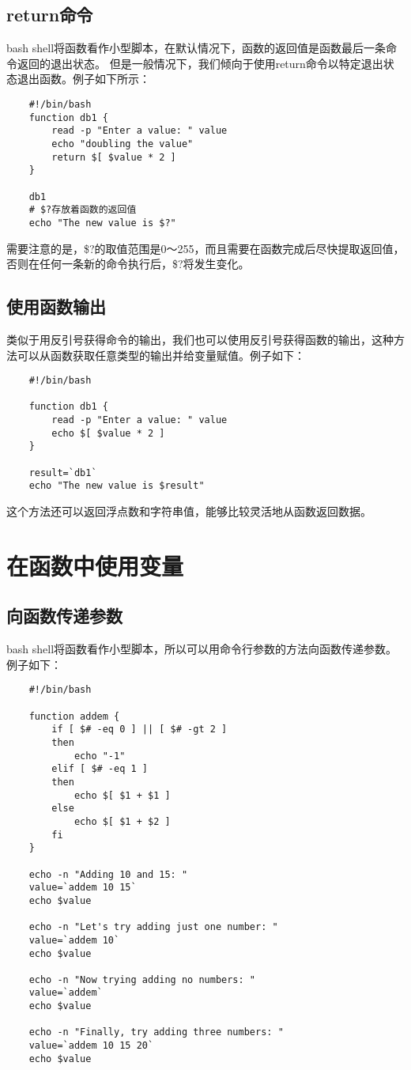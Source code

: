 \documentclass[a4paper,left=2.5cm,right=2.5cm,11pt]{article}
\begin{document}
\subsection{return命令}
	bash shell将函数看作小型脚本，在默认情况下，函数的返回值是函数最后一条命令返回的退出状态。
	但是一般情况下，我们倾向于使用return命令以特定退出状态退出函数。例子如下所示：
	\begin{lstlisting}
	#!/bin/bash
	function db1 {
		read -p "Enter a value: " value
		echo "doubling the value"
		return $[ $value * 2 ]
	}

	db1
	# $?存放着函数的返回值
	echo "The new value is $?"
	\end{lstlisting}

	需要注意的是，\$?的取值范围是0～255，而且需要在函数完成后尽快提取返回值，否则在任何一条新的命令执行后，\$?将发生变化。

\subsection{使用函数输出}
	类似于用反引号获得命令的输出，我们也可以使用反引号获得函数的输出，这种方法可以从函数获取任意类型的输出并给变量赋值。例子如下：
	\begin{lstlisting}
	#!/bin/bash

	function db1 {
		read -p "Enter a value: " value
		echo $[ $value * 2 ]
	}

	result=`db1`
	echo "The new value is $result"
	\end{lstlisting}

	这个方法还可以返回浮点数和字符串值，能够比较灵活地从函数返回数据。

\section{在函数中使用变量}
\subsection{向函数传递参数}
	bash shell将函数看作小型脚本，所以可以用命令行参数的方法向函数传递参数。例子如下：
	\begin{lstlisting}
	#!/bin/bash

	function addem {
		if [ $# -eq 0 ] || [ $# -gt 2 ]
		then
			echo "-1"
		elif [ $# -eq 1 ]
		then
			echo $[ $1 + $1 ]
		else
			echo $[ $1 + $2 ]
		fi
	}

	echo -n "Adding 10 and 15: "
	value=`addem 10 15`
	echo $value

	echo -n "Let's try adding just one number: "
	value=`addem 10`
	echo $value

	echo -n "Now trying adding no numbers: "
	value=`addem`
	echo $value

	echo -n "Finally, try adding three numbers: "
	value=`addem 10 15 20`
	echo $value
	\end{lstlisting}
\end{document}
